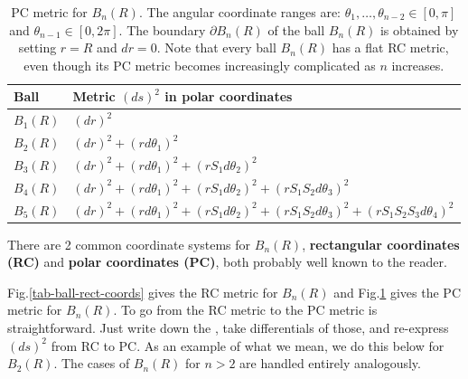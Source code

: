 \begin{table}[h!]
\centering
\begin{tabular}{|l|l|}
\hline
\rowcolor[HTML]{FFFC9E} 
Ball & Metric $(ds)^2$ in polar coordinates \\ \hline
\rowcolor[HTML]{FFFFFF} 
$B_1(R)$ & $(dr)^2$ \\ \hline
\rowcolor[HTML]{FFFFFF} 
$B_2(R)$ & \cellcolor[HTML]{FFFFFF}$(dr)^2+(r d\theta_1)^2$ \\ \hline
$B_3(R)$ & $(dr)^2+(r d\theta_1)^2+(r S_1d\theta_2)^2$ \\ \hline
$B_4(R)$ & $(dr)^2+(r d\theta_1)^2+(r S_1d\theta_2)^2+(r S_1 S_2d\theta_3)^2$ \\ \hline
$B_5(R)$ &
 $(dr)^2+(rd\theta_1)^2+(r S_1d\theta_2)^2+(r S_1 S_2d\theta_3)^2
+(r S_1 S_2 S_3 d\theta_4)^2$
\\ \hline
\end{tabular}
\caption{PC metric for $B_n(R)$. The angular coordinate ranges are:
$\theta_1,\ldots,\theta_{n-2}\in[0, \pi]$ and $ \theta_{n-1}\in[0, 2\pi].$ The boundary $\partial B_n(R)$ of the  ball $B_n(R)$ is obtained by setting $r=R$ and $dr=0$.
Note that every ball $B_n(R)$ has a flat RC metric, even though its PC metric becomes increasingly complicated as $n$ increases.
}
\label{tab-ball-hyper-polar}
\end{table}

There are 2 common 
coordinate systems for $B_n(R)$,
{\bf rectangular coordinates (RC)} and 
{\bf polar coordinates (PC)}, both 
probably well known to 
the reader.

 Fig.\ref{tab-ball-rect-coords}
gives the RC metric for $B_n(R)$
and Fig.\ref{tab-ball-hyper-polar}
gives the PC metric for $B_n(R)$.
To go from the RC metric to the PC metric is
straightforward. Just write down the 
,
take differentials of those,
and re-express $(ds)^2$ from RC to PC.
As an example of what we mean, we do this below for $B_2(R)$. The cases
of  $B_n(R)$ for $n>2$ are handled entirely analogously.


